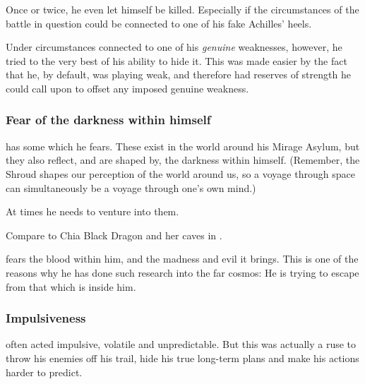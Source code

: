 Once or twice, he even let himself be killed. 
Especially if the circumstances of the battle in question could be connected to one of his fake Achilles' heels. 

Under circumstances connected to one of his \emph{genuine} weaknesses, however, he tried to the very best of his ability to hide it.
This was made easier by the fact that he, by default, was playing weak, and therefore had reserves of strength he could call upon to offset any imposed genuine weakness. 





\subsubsection{Fear of the darkness within himself}
\Ishnaruchaefir{} has some  which he fears. 
These exist in the world around his Mirage Asylum, but they also reflect, and are shaped by, the darkness within himself. 
(Remember, the Shroud shapes our perception of the world around us, so a voyage through space can simultaneously be a voyage through one's own mind.) 

At times he needs to venture into them. 

Compare to Chia Black Dragon and her caves in \cite[p.120-150]{StephenMarley:ShadowSisters}. 

\Ishnaruchaefir{} fears the \xsic{} blood within him, and the madness and evil it brings. 
This is one of the reasons why he has done such research into the far cosmos: 
He is trying to escape from that which is inside him.






\subsubsection{Impulsiveness}
\Ishnaruchaefir{} often acted impulsive, volatile and unpredictable. 
But this was actually a ruse to throw his enemies off his trail, hide his true long-term plans and make his actions harder to predict. 

